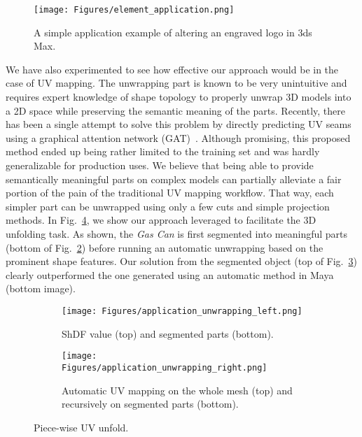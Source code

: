 \begin{figure}[h]
  \centering
   \texttt{[image: Figures/element\_application.png]}
   \caption{A simple application example of altering an engraved logo in 3ds Max.}
   \label{fig:application_element}
\end{figure}

We have also experimented to see how effective our approach would be in the case of UV mapping. The unwrapping part is known to be very unintuitive and requires expert knowledge of shape topology to properly unwrap 3D models into a 2D space while preserving the semantic meaning of the parts. Recently, there has been a single attempt to solve this problem by directly predicting UV seams using a graphical attention network (GAT)~\cite{teimury2020graphseam}. Although promising, this proposed method ended up being rather limited to the training set and was hardly generalizable for production uses. We believe that being able to provide semantically meaningful parts on complex models can partially alleviate a fair portion of the pain of the traditional UV mapping workflow. That way, each simpler part can be unwrapped using only a few cuts and simple projection methods. In Fig.~\ref{fig:unwrapping}, we show our approach leveraged to facilitate the 3D unfolding task. As shown, the \textsl{Gas Can} is first segmented into meaningful parts (bottom of Fig.~\ref{fig:sdf_seg}) before running an automatic unwrapping based on the prominent shape features. Our solution from the segmented object (top of Fig.~\ref{fig:unwrapping_uvs}) clearly outperformed the one generated using an automatic method in Maya (bottom image).
\begin{figure}
     \centering
     \begin{subfigure}{0.225\textwidth}
         \centering
         \texttt{[image: Figures/application\_unwrapping\_left.png]}
         \caption{ShDF value (top) and segmented parts (bottom).}
         \label{fig:sdf_seg}
     \end{subfigure}
     \hfill
     \begin{subfigure}{0.225\textwidth}
         \centering
         \texttt{[image: Figures/application\_unwrapping\_right.png]}
         \caption{Automatic UV mapping on the whole mesh (top) and recursively on segmented parts (bottom).}
         \label{fig:unwrapping_uvs}
     \end{subfigure}
    \caption{Piece-wise UV unfold.}
    \label{fig:unwrapping}
\end{figure}

